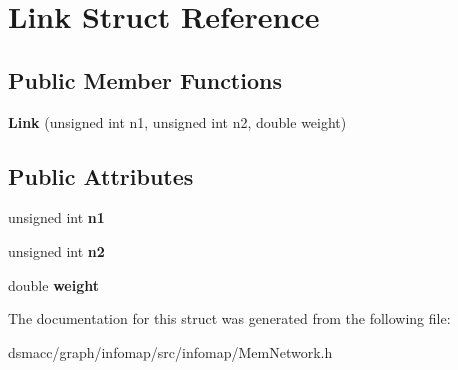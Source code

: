 \hypertarget{structLink}{}\section{Link Struct Reference}
\label{structLink}
\subsection*{Public Member Functions}
\begin{DoxyCompactItemize}
\item 
\mbox{\label{structLink_a3ba377423ace8ea194a37b7fb54e3e8d}} 
{\bfseries Link} (unsigned int n1, unsigned int n2, double weight)
\end{DoxyCompactItemize}
\subsection*{Public Attributes}
\begin{DoxyCompactItemize}
\item 
\mbox{\label{structLink_a6a4caec03f3bda9586a347d9e8802017}} 
unsigned int {\bfseries n1}
\item 
\mbox{\label{structLink_a73ee7a202faa4285d5f97baf590811ca}} 
unsigned int {\bfseries n2}
\item 
\mbox{\label{structLink_ac924aa9dda854b498cafce920e08020b}} 
double {\bfseries weight}
\end{DoxyCompactItemize}


The documentation for this struct was generated from the following file\+:\begin{DoxyCompactItemize}
\item 
dsmacc/graph/infomap/src/infomap/Mem\+Network.\+h\end{DoxyCompactItemize}
